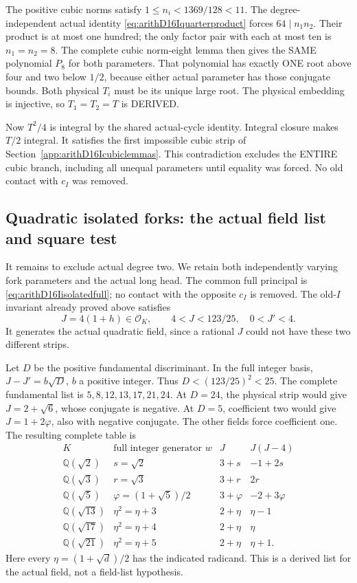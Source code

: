 \documentclass[11pt]{article}
\begin{document}
The positive cubic norms satisfy
\(1\le n_i<1369/128<11\).
The degree-independent actual identity
\eqref{eq:arithD16Iquarterproduct}
forces \(64\mid n_1n_2\).
Their product is at most one hundred;
the only factor pair with each at
most ten is \(n_1=n_2=8\).
The complete cubic norm-eight lemma
then gives the SAME polynomial \(P_8\)
for both parameters.
That polynomial has exactly ONE root
above four and two below \(1/2\),
because either actual parameter has
those conjugate bounds.
Both physical \(T_i\) must be its
unique large root.
The physical embedding is injective,
so \(T_1=T_2=T\) is DERIVED.

Now \(T^2/4\) is integral by the
shared actual-cycle identity.
Integral closure makes \(T/2\) integral.
It satisfies the first impossible
cubic strip of
Section~\ref{app:arithD16Icubiclemmas}.
This contradiction excludes the ENTIRE
cubic branch, including all unequal
parameters until equality was forced.
No old contact with \(c_I\) was removed.

\subsection{Quadratic isolated forks: the actual field list and square test}
\label{app:arithD16Iquadraticfields}

It remains to exclude actual degree two.
We retain both independently varying fork
parameters and the actual long head.
The common full principal is
\eqref{eq:arithD16Iisolatedfull}; no contact
with the opposite \(c_I\) is removed.
The old-\(I\) invariant already proved
above satisfies
\[
 J=4(1+h)\in\mathcal O_K,\qquad
                  4<J<123/25,\quad0<J'<4 .
\]
It generates the actual quadratic
field, since a rational \(J\) could
not have these two different strips.

Let \(D\) be the positive fundamental
discriminant.
In the full integer basis,
\(J-J'=b\sqrt D\), \(b\) a positive
integer.
Thus \(D<(123/25)^2<25\).
The complete fundamental list is
\(5,8,12,13,17,21,24\).
At \(D=24\), the physical strip would
give \(J=2+\sqrt6\), whose conjugate
is negative.
At \(D=5\), coefficient two would
give \(J=1+2\varphi\), also with
negative conjugate.
The other fields force coefficient
one.
The resulting complete table is
\[
\begin{array}{c|c|c|c}
 K&\text{full integer generator }w&J&J(J-4)\\ \hline
 \mathbb Q(\sqrt2)&s=\sqrt2&3+s&-1+2s\\
 \mathbb Q(\sqrt3)&r=\sqrt3&3+r&2r\\
 \mathbb Q(\sqrt5)&\varphi=(1+\sqrt5)/2&3+\varphi&-2+3\varphi\\
 \mathbb Q(\sqrt{13})&\eta^2=\eta+3&2+\eta&\eta-1\\
 \mathbb Q(\sqrt{17})&\eta^2=\eta+4&2+\eta&\eta\\
 \mathbb Q(\sqrt{21})&\eta^2=\eta+5&2+\eta&\eta+1 .
\end{array}
\]
Here every \(\eta=(1+\sqrt d)/2\)
has the indicated radicand.
This is a derived list for the
actual field, not a field-list
hypothesis.
\end{document}
